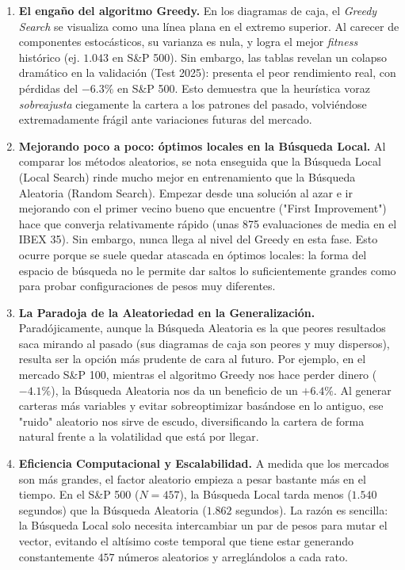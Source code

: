 \begin{enumerate}
    \item \textbf{El engaño del algoritmo Greedy.}
    En los diagramas de caja, el \textit{Greedy Search} se visualiza como una línea plana en el extremo superior. Al carecer de componentes estocásticos, su varianza es nula, y logra el mejor \textit{fitness} histórico (ej. $1.043$ en S\&P 500). Sin embargo, las tablas revelan un colapso dramático en la validación (Test 2025): presenta el peor rendimiento real, con pérdidas del $-6.3\%$ en S\&P 500. Esto demuestra que la heurística voraz \textit{sobreajusta} ciegamente la cartera a los patrones del pasado, volviéndose extremadamente frágil ante variaciones futuras del mercado.

    \item \textbf{Mejorando poco a poco: óptimos locales en la Búsqueda Local.}
    Al comparar los métodos aleatorios, se nota enseguida que la Búsqueda Local (Local Search) rinde mucho mejor en entrenamiento que la Búsqueda Aleatoria (Random Search). Empezar desde una solución al azar e ir mejorando con el primer vecino bueno que encuentre ("First Improvement") hace que converja relativamente rápido (unas 875 evaluaciones de media en el IBEX 35). Sin embargo, nunca llega al nivel del Greedy en esta fase. Esto ocurre porque se suele quedar atascada en óptimos locales: la forma del espacio de búsqueda no le permite dar saltos lo suficientemente grandes como para probar configuraciones de pesos muy diferentes.

    \item \textbf{La Paradoja de la Aleatoriedad en la Generalización.}
    Paradójicamente, aunque la Búsqueda Aleatoria es la que peores resultados saca mirando al pasado (sus diagramas de caja son peores y muy dispersos), resulta ser la opción más prudente de cara al futuro. Por ejemplo, en el mercado S\&P 100, mientras el algoritmo Greedy nos hace perder dinero ($-4.1\%$), la Búsqueda Aleatoria nos da un beneficio de un $+6.4\%$. Al generar carteras más variables y evitar sobreoptimizar basándose en lo antiguo, ese "ruido" aleatorio nos sirve de escudo, diversificando la cartera de forma natural frente a la volatilidad que está por llegar.

    \item \textbf{Eficiencia Computacional y Escalabilidad.}
    A medida que los mercados son más grandes, el factor aleatorio empieza a pesar bastante más en el tiempo. En el S\&P 500 ($N=457$), la Búsqueda Local tarda menos ($1.540$ segundos) que la Búsqueda Aleatoria ($1.862$ segundos). La razón es sencilla: la Búsqueda Local solo necesita intercambiar un par de pesos para mutar el vector, evitando el altísimo coste temporal que tiene estar generando constantemente $457$ números aleatorios y arreglándolos a cada rato.
\end{enumerate}

